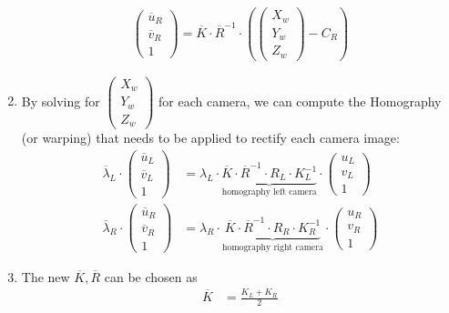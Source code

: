 \documentclass[a4paper,12 pt]{article}
\theoremstyle{definition}
\theoremstyle{remark}
\theoremstyle{definition}
\theoremstyle{definition}
\theoremstyle{definition}
\theoremstyle{remark}
\theoremstyle{definition}
\begin{document}
\begin{enumerate}
\begin{equation}
\begin{split}
\begin{pmatrix}
 \overline{u}_R\\
 \overline{v}_R\\
 1
 \end{pmatrix}= \overline{K}\cdot \overline{R}^{-1}\cdot \left(\begin{pmatrix}
 X_w\\
 Y_w\\
 Z_w
 \end{pmatrix}-C_R\right) 
\end{split}
\end{equation}
\item By solving for $\begin{pmatrix}
 X_w\\
 Y_w\\
 Z_w \end{pmatrix}$ for each camera, we can compute the Homography (or warping) that needs to be applied to rectify each camera image:
\begin{equation}
\begin{split}
\overline{\lambda}_L\cdot \begin{pmatrix}
 \overline{u}_L\\
 \overline{v}_L\\
 1
 \end{pmatrix}&=\lambda_L \cdot \underbrace{\overline{K}\cdot \overline{R}^{-1} \cdot R_L \cdot K_L^{-1}}_{\text{homography left camera}} \cdot \begin{pmatrix}
 u_L\\
 v_L\\
 1
 \end{pmatrix}\\
 \overline{\lambda}_R\cdot \begin{pmatrix}
 \overline{u}_R\\
 \overline{v}_R\\
 1
 \end{pmatrix}&=\lambda_R \cdot \underbrace{\overline{K}\cdot \overline{R}^{-1} \cdot R_R \cdot K_R^{-1}}_{\text{homography right camera}} \cdot \begin{pmatrix}
 u_R\\
 v_R\\
 1
 \end{pmatrix}
\end{split}
\end{equation}
\item The new $\overline{K},\overline{R}$ can be chosen as
\begin{equation}
\begin{split}
\overline{K}&=\frac{K_L+K_R}{2}\\

\end{split}
\end{equation}
\end{enumerate}
\end{document}
